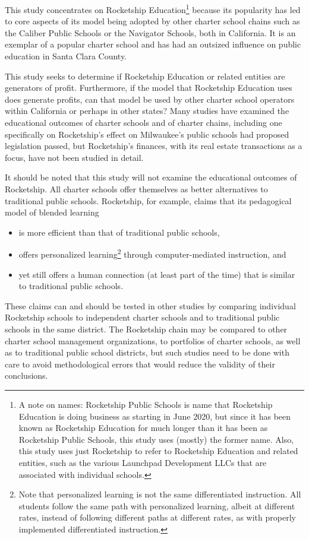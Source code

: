 This study concentrates on Rocketship Education\footnote{A note on names: Rocketship Public Schools is name that Rocketship Education is doing business as starting in June 2020, but since it has been known as Rocketship Education for much longer than it has been as Rocketship Public Schools, this study uses (mostly) the former name. Also, this study uses just Rocketship to refer to Rocketship Education and related entities, such as the various Launchpad Development LLCs that are associated with individual schools.} because its popularity has led to core aspects of its model being adopted by other charter school chains such as the Caliber Public Schools or the Navigator Schools, both in California.  It is an exemplar of a popular charter school and has had an outsized influence on public education in Santa Clara County.

This study seeks to determine if Rocketship Education or related entities are generators of profit. Furthermore, if the model that Rocketship Education uses does generate profits, can that model be used by other charter school operators within California or perhaps in other states? Many studies have examined the educational outcomes of charter schools and of charter chains, including one specifically on Rocketship's effect on Milwaukee's public schools had proposed legislation passed, but Rocketship's finances, with its real estate transactions as a focus, have not been studied in detail.

It should be noted that this study will not examine the educational outcomes of Rocketship. All charter schools offer themselves as better alternatives to traditional public schools. Rocketship, for example, claims that its pedagogical model of blended learning
\begin{itemize}
  \item is more efficient than that of traditional public schools,
  \item offers personalized learning\footnote{Note that personalized learning is not the same differentiated instruction. All students follow the same path with personalized learning, albeit at different rates, instead of following different paths at different rates, as with properly implemented differentiated instruction.} through computer-mediated instruction, and
  \item yet still offers a human connection (at least part of the time) that is similar to traditional public schools.
\end{itemize}
These claims can and should be tested in other studies by comparing individual Rocketship schools to independent charter schools and to traditional public schools in the same district. The Rocketship chain may be compared to other charter school management organizations, to portfolios of charter schools, as well as to traditional public school districts, but such studies need to be done with care to avoid methodological errors that would reduce the validity of their conclusions.

